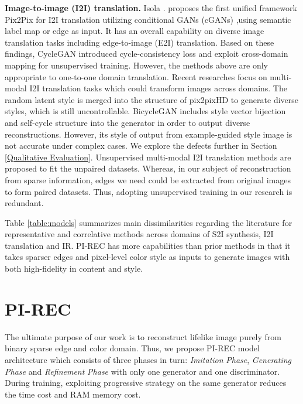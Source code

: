 \documentclass[10pt,twocolumn,letterpaper]{article} \usepackage{amsfonts,amssymb}
\begin{document}
{\bf Image-to-image (I2I) translation.} Isola  . \cite{isola2017image} proposes the first unified framework Pix2Pix for I2I translation utilizing conditional GANs (cGANs) \cite{mirza2014conditional},using semantic label map or edge as input. It has an overall capability on diverse image translation tasks inc\-lu\-ding edge-to-image (E2I) translation. Based on these fin\-dings, CycleGAN \cite{zhu2017unpaired} introduced cycle-consistency loss and exploit cross-domain mapping for unsupervised training. However, the methods above are only appropriate to one-to-one domain translation. Recent researches focus on multi-modal I2I translation\cite{choi2018stargan,romero2018smit,anoosheh2018combogan} tasks which could transform images across domains. The random latent style is merged into the structure of pix2pixHD \cite{wang2018high} to generate diverse styles, which is still uncontrollable. BicycleGAN \cite{zhu2017toward} includes style vector bijection and self-cycle structure into the generator in order to output diverse reconstructions. However, its style of output from example-guided style image is not accurate under complex cases. We explore the defects further in Section \ref{Qualitative Evaluation}. Unsupervised multi-modal I2I translation methods \cite{lee2018diverse} are proposed to fit the unpaired datasets. Whereas, in our subject of reconstruction from sparse information, edges we need could be extracted from original images to form paired datasets. Thus, adopting unsupervised training in our research is redundant.

Table \ref{table:models} summarizes main dissimilarities regarding the literature for representative and correlative methods across domains of S2I synthesis, I2I translation and IR. PI-REC has more capabilities than prior methods in that it takes sparser edges and pixel-level color style as inputs to generate images with both high-fidelity in content and style.

\section{PI-REC} \label{PI-REC}The ultimate purpose of our work is to reconstruct lifelike image purely from binary sparse edge and color domain.  Thus, we propose PI-REC model architecture which consists of three phases in turn: \emph{Imitation} \emph{Phase}, \emph{Generating} \emph{Phase} and \emph{Refinement} \emph{Phase} with only one generator and one discriminator. During training, exploiting progressive strategy on the same generator reduces the time cost and RAM memory cost.
\end{document}
